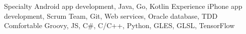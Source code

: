 
\begin{cvskills}
	\cvskill
		{Specialty}
		{Android app development, Java, Go, Kotlin}
	\cvskill
		{Experience}
		{iPhone app development, Scrum Team, Git, Web services, Oracle database, TDD}
	\cvskill
		{Comfortable}
		{Groovy, JS, C\#, C/C++, Python, GLES, GLSL, TensorFlow}
\end{cvskills}

